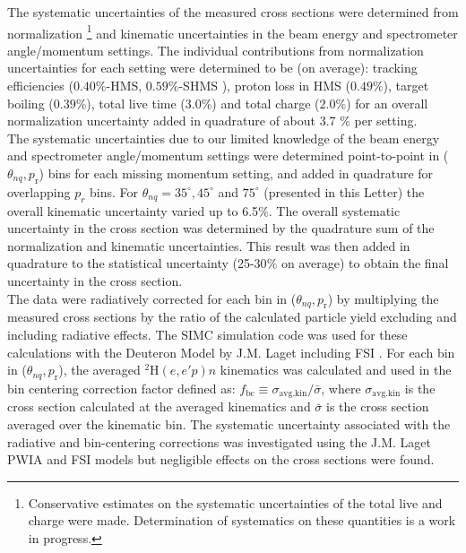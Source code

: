 \indent The systematic uncertainties of the measured cross sections were determined from 
normalization \footnote{Conservative estimates on the systematic uncertainties of the total live and charge were made.
Determination of systematics on these quantities is a work in progress.} and kinematic uncertainties in the beam energy and spectrometer angle/momentum settings. The individual
contributions from normalization uncertainties for each setting were determined to be (on average): tracking efficiencies ($0.40 \%$-HMS, $0.59 \%$-SHMS ), proton loss in HMS ($0.49 \%$), target boiling ($0.39 \%$), total live time ($3.0 \%$) and total charge ($2.0\%$)
for an overall normalization uncertainty added in quadrature of about 3.7 $\%$ per setting. \\
\indent The systematic uncertainties due to our limited knowledge of the beam energy and spectrometer angle/momentum settings were determined point-to-point in ($\theta_{nq}, p_{\mathrm{r}}$) bins for each missing momentum setting,
and added in quadrature for overlapping $p_{r}$ bins. For $\theta_{nq}= 35^{\circ}, 45^{\circ}$ and $75^{\circ}$ (presented in this Letter) the overall kinematic uncertainty varied up to 6.5$\%$.
The overall systematic uncertainty in the cross section was determined by the quadrature sum of the normalization and kinematic uncertainties. This result was then added in quadrature
to the statistical uncertainty (25-30$\%$ on average) to obtain the final uncertainty in the cross section. \\
\indent The data were radiatively corrected for each bin in ($\theta_{nq}, p_{\mathrm{r}}$) by multiplying the measured cross sections by the ratio of the calculated particle yield excluding and including radiative effects. The SIMC simulation code was used for these calculations with the Deuteron Model by J.M. Laget including FSI \cite{LAGET2005}.
For each bin in ($\theta_{nq}, p_{\mathrm{r}}$), the averaged $^{2}\mathrm{H}(e,e'p)n$ kinematics was calculated and used in the bin centering correction factor defined as:
$f_{\mathrm{bc}} \equiv \sigma_{\mathrm{avg.kin}} / \bar{\sigma}$, where $\sigma_{\mathrm{avg.kin}}$ is the cross section calculated at the averaged kinematics and $\bar{\sigma}$ is the cross section averaged
over the kinematic bin. The systematic uncertainty associated with the radiative and bin-centering corrections was investigated using the J.M. Laget PWIA and FSI models but negligible effects on the cross sections were found.\\

